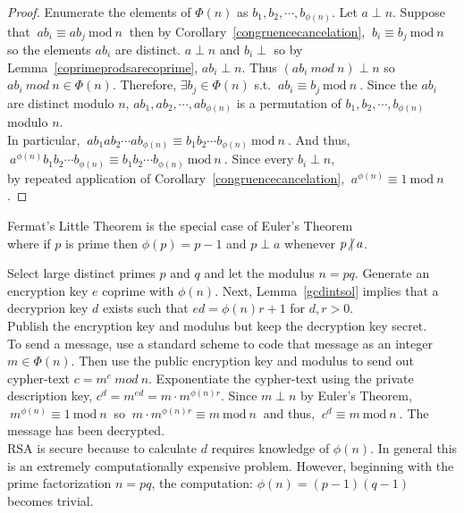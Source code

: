 \documentclass[12pt]{extarticle}
\newcommand{\ndivides}{\centernot \mid}
\newenvironment{definition}[1][Definition:]{\begin{trivlist}
\item[\hskip \labelsep {\bfseries #1}]}{\end{trivlist}}
\renewcommand{\mod}[3]{\: #1 \equiv #2 \: \mathrm{mod} \: #3 \:}
\begin{document}
\begin{proof}
Enumerate the elements of $\Phi (n)$ as $b_1, b_2, \cdots , b_{\phi (n)}$. Let $a \perp n$. Suppose that $\mod{ab_i}{ab_j}{n}$ then by Corollary~\ref{congruencecancelation}, $\mod{b_i}{b_j}{n}$ so the elements $ab_i$ are distinct. $a \perp n$ and $b_i \perp$ so by Lemma~\ref{coprimeprodsarecoprime}, $ab_i \perp n$. Thus $(ab_i \: mod \: n) \perp n$ so $ab_i \: mod \: n \in \Phi (n)$. Therefore, $\exists b_j \in \Phi (n)$ s.t. $\mod{ab_i}{b_j}{n}$. Since the $ab_i$ are distinct modulo $n$, $ab_1, ab_2, \cdots, ab_{\phi (n)}$ is a permutation of $b_1, b_2, \cdots , b_{\phi (n)}$ modulo $n$. \\
In particular, $\mod{ab_1 ab_2 \cdots ab_{\phi (n)}}{b_1 b_2 \cdots b_{\phi (n)}}{n}$. And thus, \\ $\mod{a^{\phi (n)}b_1 b_2 \cdots b_{\phi (n)}}{b_1 b_2 \cdots b_{\phi (n)}}{n}$.  Since every $b_i \perp n$, \\ by repeated application of Corollary~\ref{congruencecancelation}, $\mod{a^{\phi (n)}}{1}{n}$.
\end{proof}

\noindent Fermat's Little Theorem is the special case of Euler's Theorem \\ where if $p$ is prime then $\phi (p) = p-1$ and $p \perp a$ whenever $p \ndivides a$.

\begin{definition}[RSA Encryption]
Select large distinct primes $p$ and $q$ and let the modulus $n = pq$. Generate an encryption key $e$ coprime with $\phi (n)$. Next, Lemma~\ref{gcdintsol} implies that a decryprion key $d$ exists such that $ed = \phi (n)r + 1$ for $d,r > 0$. \\ Publish the encryption key and modulus but keep the decryption key secret. \\
To send a message, use a standard scheme to code that message as an integer $m \in \Phi (n)$. Then use the public encryption key and modulus to send out cypher-text  $c = m^e \: mod \: n$. Exponentiate the cypher-text using the private description key, $c^d = m^{ed} = m \cdot m^{\phi (n) r}$. Since $m \perp n$ by Euler's Theorem, $\mod{m^{\phi (n)}}{1}{n}$ so $\mod{m \cdot m^{\phi (n) r}}{m}{n}$ and thus, $\mod{c^d}{m}{n}$. The message has been decrypted. \\
RSA is secure because to calculate $d$ requires knowledge of $\phi (n)$. In general this is an extremely computationally expensive problem. However, beginning with the prime factorization $n = pq$, the computation: $\phi (n) = (p-1)(q-1)$ becomes trivial.

\end{definition}
\end{document}
